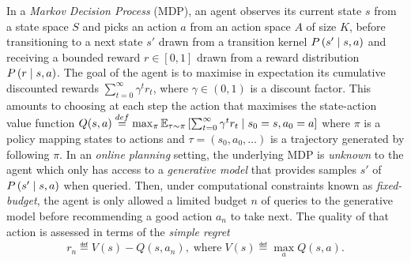 \documentclass[runningheads]{llncs}
\begin{document}
In a \emph{Markov Decision Process} (MDP), an agent observes its current state $s$ from a state space $S$ and picks an action $a$ from an action space $A$ of size $K$, before transitioning to a next state $s'$ drawn from a transition kernel $P\left(s'\;\middle|\; s,a\right)$ and receiving a bounded reward $r\in[0, 1]$ drawn from a reward distribution $P\left(r \;\middle|\; s,a\right)$.
The goal of the agent is to maximise in expectation its cumulative discounted rewards $\sum_{t=0}^\infty \gamma^t r_t$, where $\gamma\in(0, 1)$ is a discount factor. This amounts to choosing at each step the action that maximises the state-action value function %
$
Q(s, a) \stackrel{def}{=} \max_\pi  \operatorname*{\mathbb{E}}_{\tau\sim\pi} \left[\sum_{t=0}^\infty \gamma^t r_t\;\middle|\; s_0 = s, a_0 = a\right]
$
where $\pi$ is a policy mapping states to actions and $\tau = (s_0, a_0, \dots)$ is a trajectory generated by following $\pi$. In an \emph{online planning} setting, the underlying MDP is \emph{unknown} to the agent which only has access to a \emph{generative model} that provides samples $s'$ of $P\left(s' \;\middle|\; s, a\right)$ when queried. Then, under computational constraints known as \emph{fixed-budget}, the agent is only allowed a limited budget $n$ of queries to the generative model before recommending a good action $a_n$ to take next.
The quality of that action is assessed in terms of the \emph{simple regret}
\begin{align}
	r_n \eqdef V(s) - Q(s, {a}_n), \; \mbox{where} \; V(s) \eqdef  \max_a Q(s, a).
\end{align}
\end{document}
